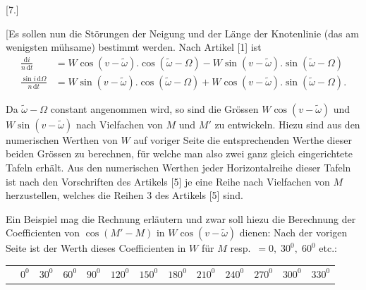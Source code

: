 \clearpage
\begin{landscape}
\begingroup
\fontsize{10}{13}\selectfont
{}
\renewcommand{\headrulewidth}{0pt}
\newcommand{\VSevenPoint}{\mathord{.}\mkern5mu}
\newcommand{\VSevenFivePoints}{\VSevenPoint\VSevenPoint\VSevenPoint\VSevenPoint\VSevenPoint}
\begin{center}[7.]\end{center}
\par\noindent\hspace*{\parindent}[Es sollen nun die Störungen der Neigung und der Länge der Knotenlinie (das am wenigsten mühsame) bestimmt werden. Nach Artikel [1] ist
\[
\begin{aligned}
\frac{\mathrm{d}i}{n\,\mathrm{d}t}&=W\cos(v-\tilde\omega)\mathord{.}\cos(\tilde\omega-\Omega)-W\sin(v-\tilde\omega)\mathord{.}\sin(\tilde\omega-\Omega)\\
\frac{\sin i\,\mathrm{d}\Omega}{n\,\mathrm{d}t}&=W\sin(v-\tilde\omega)\mathord{.}\cos(\tilde\omega-\Omega)+W\cos(v-\tilde\omega)\mathord{.}\sin(\tilde\omega-\Omega).
\end{aligned}
\]
\par\noindent\hspace*{\parindent}Da \(\tilde\omega-\Omega\) constant angenommen wird, so sind die Grössen \(W\cos(v-\tilde\omega)\) und \(W\sin(v-\tilde\omega)\) nach Vielfachen von \(M\) und \(M'\) zu entwickeln. Hiezu sind aus den numerischen Werthen von \(W\) auf voriger Seite die entsprechenden Werthe dieser beiden Grössen zu berechnen, für welche man also zwei ganz gleich eingerichtete Tafeln erhält. Aus den numerischen Werthen jeder Horizontalreihe dieser Tafeln ist nach den Vorschriften des Artikels [5] je eine Reihe nach Vielfachen von \(M\) herzustellen, welches die Reihen 3 des Artikels [5] sind.
\par\noindent\hspace*{\parindent}Ein Beispiel mag die Rechnung erläutern und zwar soll hiezu die Berechnung der Coefficienten von \(\cos(M'-M)\) in \(W\cos(v-\tilde\omega)\) dienen: Nach der vorigen Seite ist der Werth dieses Coefficienten in \(W\) für \(M\) resp.\ \(=0,\;30^0,\;60^0\) etc.:
\begin{center}
\begingroup\fontsize{8.5}{11}\selectfont\setlength{\tabcolsep}{3pt}
\begin{tabular}{@{}l*{12}{r}@{}}
&\(0^0\)&\(30^0\)&\(60^0\)&\(90^0\)&\(120^0\)&\(150^0\)&\(180^0\)&\(210^0\)&\(240^0\)&\(270^0\)&\(300^0\)&\(330^0\)\\[4pt]

\end{tabular}
\end{center}
\end{landscape}

